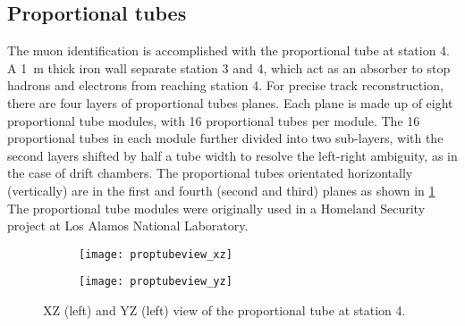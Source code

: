 \documentclass[../main.tex]{subfiles}
\begin{document}
\subsection{Proportional tubes}
The muon identification is accomplished with the proportional tube at station 4. A \SI{1}{\meter} thick
iron wall separate station 3 and 4, which act as an absorber to stop hadrons and electrons from reaching
station 4. For precise track reconstruction, there are four layers of proportional tubes planes. Each plane
is made up of eight proportional tube modules, with 16 proportional tubes per module. The 16 proportional tubes
in each module further divided into two sub-layers, with the second layers shifted by half a tube width to
resolve the left-right ambiguity, as in the case of drift chambers. The proportional tubes orientated horizontally
(vertically) are in the first and fourth (second and third) planes as shown in \cref{fig:prop}
The proportional tube modules were originally used in a Homeland Security project at Los Alamos National Laboratory.

\begin{figure}[ht!]
	\centering
	\begin{subfigure}{0.45\linewidth}
		\texttt{[image: proptubeview\_xz]}
	\end{subfigure}
	\begin{subfigure}{0.45\linewidth}
		\texttt{[image: proptubeview\_yz]}
	\end{subfigure}
	\caption{XZ (left) and YZ (left) view of the proportional tube at station 4.}
	\label{fig:prop}
\end{figure}
\end{document}
